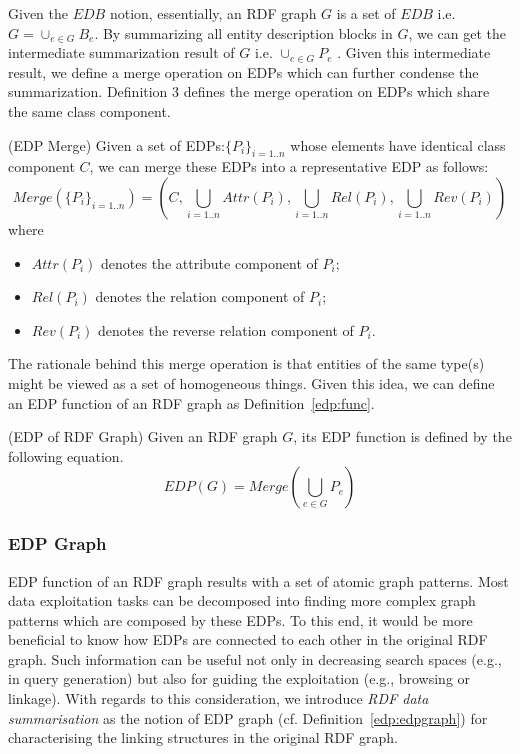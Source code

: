 Given the $EDB$ notion, essentially, an RDF graph $G$ is a set of $EDB$ i.e. $G=\cup_{e \in G}{B_e}$. By summarizing all entity description blocks in $G$, we can get the intermediate summarization result of $G$ i.e. $\cup_{e \in G}{P_e}$ . Given this intermediate result, we define a merge operation on EDPs which can further condense the summarization. Definition 3 defines the merge operation on EDPs which share the same class component. 

\begin{definition} 
\label{edp:merge}
(EDP Merge)  Given a set of EDPs:$\{P_i\}_{i=1..n}$ whose elements have identical class component $C$, we can merge these EDPs into a representative EDP as follows:
\begin{equation}
Merge(\{P_i\}_{i=1..n})=(C, \bigcup_{i=1..n}{Attr(P_i)}, \bigcup_{i=1..n}{Rel(P_i)}, \bigcup_{i=1..n}{Rev(P_i)})
\end{equation}
where
\begin{itemize}
\item $Attr(P_i)$ denotes the attribute component of $P_i$;
\item $Rel(P_i)$ denotes the relation component of $P_i$;
\item $Rev(P_i)$ denotes the reverse relation component of $P_i$.
\end{itemize}
\end{definition}

The rationale behind this merge operation is that entities of the same type(s) might be viewed as a set of homogeneous things. Given this idea, we can define an EDP function of an RDF graph as Definition~\ref{edp:func}.

\begin{definition} 
\label{edp:func}
(EDP of RDF Graph) Given an RDF graph $G$, its EDP function is defined by the following equation.
\begin{equation}
EDP(G)=Merge(\bigcup_{e \in G}{P_e})
\end{equation}
\end{definition}

\vspace{-5ex}
\subsubsection{EDP Graph}
EDP function of an RDF graph results with a set of atomic graph patterns. Most data exploitation tasks can be decomposed into finding more complex graph patterns which are composed by these EDPs. To this end, it would be more beneficial to know how EDPs are connected to each other in the original RDF graph. Such information can be useful not only in decreasing search spaces (e.g., in query generation) but also for guiding the exploitation (e.g., browsing or linkage). With regards to this consideration, we introduce \emph{RDF data summarisation} as the notion of EDP graph (cf. Definition~\ref{edp:edpgraph}) for characterising the linking structures in the original RDF graph.

